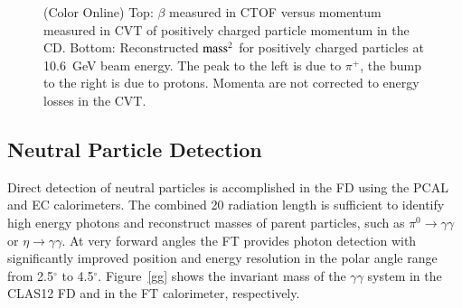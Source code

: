 \documentclass[final,3p,twocolumn]{elsarticle}
\begin{document}
\begin{figure}[t!]
\caption{(Color Online) Top: $\beta$ measured in CTOF versus momentum measured in CVT of positively 
charged particle momentum in the CD. Bottom: Reconstructed $\rm mass^2$ for positively charged particles
 at 10.6~GeV beam energy. The peak to the left is due to $\pi^+$, the bump to the right is due to protons. 
 Momenta are not corrected to energy losses in the CVT.}
\label{CD-PID}
\end{figure} 

\subsection{Neutral Particle Detection} 

Direct detection of neutral particles is accomplished in the FD using the PCAL and EC calorimeters. The combined
20 radiation length is sufficient to identify high energy photons and reconstruct masses of parent particles, such
as $\pi^0\to \gamma \gamma$  or $\eta \to \gamma \gamma$. At very forward angles the FT provides photon
detection with significantly improved position and energy resolution in the polar angle range from 2.5$^\circ$ to
4.5$^\circ$. Figure~\ref{gg} shows the invariant mass of the $\gamma\gamma$ system in the CLAS12 FD and in
the FT calorimeter, respectively. 
\end{document}
